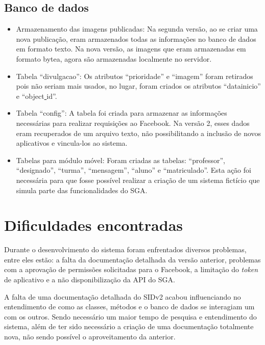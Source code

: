 \subsection{Banco de dados}
    \begin{itemize}
        \item Armazenamento das imagens publicadas: Na segunda versão, ao se criar uma nova publicação, eram armazenados todas as informações no banco de dados em formato texto. Na nova versão, as imagens que eram armazenadas em formato bytea, agora são armazenadas localmente no servidor.
            
        \item Tabela ``divulgacao'': Os atributos ``prioridade'' e ``imagem'' foram retirados pois não seriam mais usados, no lugar, foram criados os atributos ``datainicio'' e ``object\underline{{ }}id''.
            
        \item Tabela ``config'': A tabela foi criada para armazenar as informações necessárias para realizar requisições ao Facebook. Na versão 2, esses dados eram recuperados de um arquivo texto, não possibilitando a inclusão de novos aplicativos e vincula-los ao sistema.
        
        \item Tabelas para módulo móvel: Foram criadas as tabelas: ``professor'', ``designado'', ``turma'', ``mensagem'', ``aluno'' e ``matriculado''. Esta ação foi necessária para que fosse possível realizar a criação de um sistema fictício que simula parte das funcionalidades do SGA.
    \end{itemize}

\section{Dificuldades encontradas}
Durante o desenvolvimento do sistema foram enfrentados diversos problemas, entre eles estão: a falta da documentação detalhada da versão anterior, problemas com a aprovação de permissões solicitadas para o Facebook, a limitação do \textit{token} de aplicativo e a não disponibilização da API do SGA.

A falta de uma documentação detalhada do SIDv2 acabou influenciando no entendimento de como as classes, métodos e o banco de dados se interagiam um com os outros. Sendo necessário um maior tempo de pesquisa e entendimento do sistema, além de ter sido necessário a criação de uma documentação totalmente nova, não sendo possível o aproveitamento da anterior.

